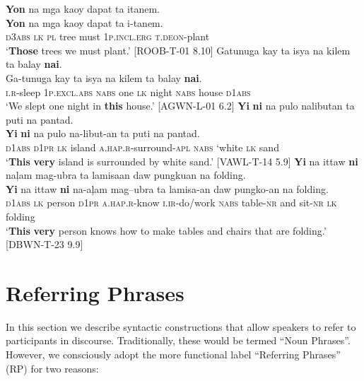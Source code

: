 \newpage
\ea
\textbf{Yon}  na  mga  kaoy  dapat  ta  itanem. \\\smallskip
 \gll \textbf{Yon}  na  mga  kaoy  dapat  ta  i-tanem. \\
\textsc{d3abs}  \textsc{lk}  \textsc{pl}  tree  must  1\textsc{p.incl.erg}  \textsc{t.deon}-plant \\
\glt ‘\textbf{Those} trees we must plant.’ [ROOB-T-01 8.10]
\z
\ea
Gatunuga  kay  ta  isya  na  kilem  ta  balay  \textbf{nai}. \\\smallskip
 \gll Ga-tunuga  kay  ta  isya  na  kilem  ta  balay  \textbf{nai}. \\
\textsc{i.r}-sleep  1\textsc{p.excl.abs}  \textsc{nabs}  one  \textsc{lk}  night  \textsc{nabs}  house  \textsc{d}1\textsc{abs} \\
\glt ‘We slept one night in \textbf{this} house.' [AGWN-L-01 6.2]
\z
\ea
\textbf{Yi} \textbf{ni}  na  pulo  nalibutan  ta  puti  na  pantad. \\\smallskip
 \gll \textbf{Yi} \textbf{ni}  na  pulo  na-libut-an  ta  puti  na  pantad. \\
\textsc{d1abs} \textsc{d1pr} \textsc{lk}  island  \textsc{a.hap.r}-surround-\textsc{apl}  \textsc{nabs} ‘white  \textsc{lk}   sand \\
\glt ‘\textbf{This} \textbf{very} island is surrounded by white sand.’ [VAWL-T-14 5.9]
\z
\ea
\textbf{Yi}  na  ittaw  \textbf{ni}  naļam  mag-ubra  ta  lamisaan daw pungkuan  na  folding. \\\smallskip
 \gll \textbf{Yi}  na  ittaw  \textbf{ni}  na-aļam  mag--ubra  ta  lamisa-an daw pungko-an  na  folding. \\
\textsc{d1abs}  \textsc{lk}  person  \textsc{d1pr}  \textsc{a.hap.r}-know  \textsc{i.ir}-do/work  \textsc{nabs}  table-\textsc{nr} and
sit-\textsc{nr}  \textsc{lk}  folding \\
\glt `\textbf{This} \textbf{very} person knows how to make tables and chairs that are folding.’ [DBWN-T-23 9.9]
\z

\section{Referring Phrases}
\label{sec:referringphrases}
In this section we describe syntactic constructions that allow speakers to refer to participants in discourse. Traditionally, these would be termed “Noun Phrases”. However, we consciously adopt the more functional label “Referring Phrases” (RP) for two reasons:

